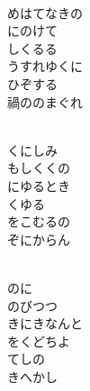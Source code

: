 \documentclass[10pt,b5j]{tarticle} %
\begin{document}
\begin{enumerate}
\begin{minipage}[c]{\blocksize}
        \vspace{\linespace}
        \item~\\
        めはてなきの\\
        にのけて\\
        しくるる\\
        うすれゆくに\\
        ひぞする\\
        禍ののまぐれ
        
        \vspace{\linespace}
        \item~\\
        くにしみ\\
        もしくくの\\
        にゆるとき\\
        くゆる\\
        をこむるの\\
        ぞにからん
        
        \vspace{\linespace}
        \item~\\
        のに\\
        のびつつ\\
        きにきなんと\\
        をくどちよ\\
        てしの\\
        きへかし
    
    \end{minipage}
\end{enumerate} %
\end{document}
